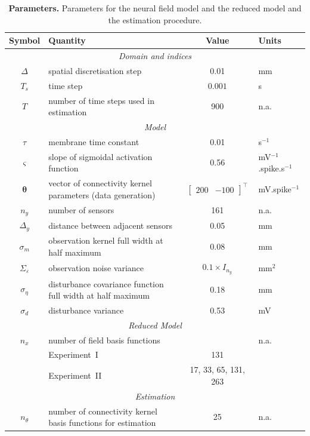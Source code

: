 \documentclass[review,authoryear,3p]{elsarticle}
\begin{document}
\begin{table}[!ht]
\begin{tabular}{|c|l|c|l|}
	\hline
	\textbf{Symbol} & \textbf{Quantity} & \textbf{Value} & \textbf{Units}\\
	\hline
	\multicolumn{4}{|c|}{\emph{Domain and indices}}\\
	\hline
	$\Delta$ & spatial discretisation step & 0.01 & mm \\
	$T_s$ & time step & $0.001$ & s\\
	$T$ & number of time steps used in estimation & 900 & n.a.\\
	\hline 
\multicolumn{4}{|c|}{\emph{Model}}\\
	\hline
	$\tau$ & membrane time constant & 0.01 & s$^{-1}$ \\
	$\varsigma$ & slope of sigmoidal activation function & 0.56 \citep{Wendling2005} & mV$^{-1}$.spike.s$^{-1}$\\
	$\boldsymbol{\theta}$ & vector of connectivity kernel parameters (data generation) & $\left[\begin{array}{cc}
	200 & -100
	\end{array}
	\right]^{\top}$ & mV.spike$^{-1}$\\
	$n_y$ & number of sensors & 161 & n.a.\\ 
	$\Delta_y$ & distance between adjacent sensors & 0.05 & mm\\
	$\sigma_{m}$ & observation kernel full width at half maximum & 0.08 & mm \\
	$\Sigma_{\varepsilon}$ & observation noise variance & $0.1 \times I_{n_y}$ & mm$^2$ \\
	$\sigma_{\eta}$& disturbance covariance function full width at half maximum & 0.18 & mm\\
	$\sigma_{d}$ & disturbance variance & 0.53 & mV \\
	\hline 
	\multicolumn{4}{|c|}{\emph{Reduced Model}}\\
	\hline
	$n_x$ & number of field basis functions&& n.a.\\
	$   $ &Experiment~I&131&\\
	$   $ &Experiment~II&17, 33, 65, 131, 263&\\ 
	\hline 
	\multicolumn{4}{|c|}{\emph{Estimation}}\\ 
	\hline
	$n_{\theta}$&number of connectivity kernel basis functions for estimation&25&n.a.\\
	\hline 
\end{tabular}
\caption{\textbf{Parameters.} Parameters for the neural field model and the reduced model and the estimation procedure.}
\label{tab:Parameters}
\end{table} 
\end{document}
